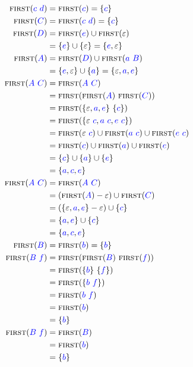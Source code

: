 \documentclass{article}
\newcommand{\FIRST}{\textsc{first}}
\newcommand{\Symbol}[1]{\textcolor{blue}{#1}}
\newcommand{\Null}{\varepsilon}
\newcommand{\Seq}{\ }
\begin{document}
\begin{align*}
  \FIRST(\Symbol{c} \Seq \Symbol{d}) &= \FIRST(\Symbol{c}) = \{\Symbol{c}\} \\
  \FIRST(\Symbol{C}) &= \FIRST(\Symbol{c} \Seq \Symbol{d}) = \{\Symbol{c}\} \\
  \FIRST(\Symbol{D}) &= \FIRST(\Symbol{e}) \cup \FIRST(\Null) \\
            &= \{\Symbol{e}\} \cup \{\Null\} = \{\Symbol{e}, \Null\} \\
  \FIRST(\Symbol{A}) &= \FIRST(\Symbol{D}) \cup \FIRST(\Symbol{a} \Seq \Symbol{B}) \\
            &= \{\Symbol{e}, \Null\} \cup \{\Symbol{a}\} = \{\Null, \Symbol{a}, \Symbol{e}\} \\
  \FIRST(\Symbol{A} \Seq \Symbol{C}) &= \FIRST(\Symbol{A} \Seq \Symbol{C}) \\
            &= \FIRST(\FIRST(\Symbol{A}) \Seq \FIRST(\Symbol{C})) \\
            &= \FIRST(\{\Null, \Symbol{a}, \Symbol{e}\} \Seq \{\Symbol{c}\})\\
            &= \FIRST(\{\Null \Seq \Symbol{c}, \Symbol{a} \Seq \Symbol{c}, \Symbol{e} \Seq \Symbol{c}\})\\
            &= \FIRST(\Null \Seq \Symbol{c}) \cup \FIRST(\Symbol{a} \Seq \Symbol{c}) \cup \FIRST(\Symbol{e} \Seq \Symbol{c}) \\
            &= \FIRST(\Symbol{c}) \cup \FIRST(\Symbol{a}) \cup \FIRST(\Symbol{e}) \\
            &= \{\Symbol{c}\} \cup \{\Symbol{a}\} \cup \{\Symbol{e}\} \\
            &= \{\Symbol{a}, \Symbol{c}, \Symbol{e}\}\\
  \FIRST(\Symbol{A} \Seq \Symbol{C}) &= \FIRST(\Symbol{A} \Seq \Symbol{C}) \\
            &= (\FIRST(\Symbol{A}) - \Null) \cup \FIRST(\Symbol{C}) \\
            &= (\{\Null, \Symbol{a}, \Symbol{e}\} - \Null) \cup \{\Symbol{c}\} \\
            &= \{\Symbol{a}, \Symbol{e}\} \cup \{\Symbol{c}\}\\
            &= \{\Symbol{a}, \Symbol{c}, \Symbol{e}\}\\
  \FIRST(\Symbol{B}) &= \FIRST(\Symbol{b}) = \{\Symbol{b}\} \\
  \FIRST(\Symbol{B} \Seq \Symbol{f}) &= \FIRST(\FIRST(\Symbol{B}) \Seq \FIRST(\Symbol{f})) \\
            &= \FIRST(\{\Symbol{b}\} \Seq \{\Symbol{f}\})\\
            &= \FIRST(\{\Symbol{b} \Seq \Symbol{f}\})\\
            &= \FIRST(\Symbol{b} \Seq \Symbol{f})\\
            &= \FIRST(\Symbol{b})\\
            &= \{\Symbol{b}\}\\
  \FIRST(\Symbol{B} \Seq \Symbol{f}) &= \FIRST(\Symbol{B})\\
            &= \FIRST(\Symbol{b})\\
            &= \{\Symbol{b}\}
\end{align*}
\end{document}
